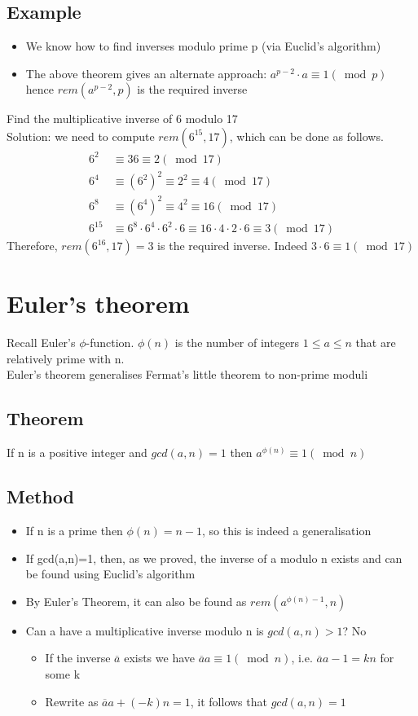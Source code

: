\documentclass{article}[18pt]
\begin{document}
\subsection{Example}
\begin{itemize}
	\item We know how to find inverses modulo prime p (via Euclid's algorithm)
	\item The above theorem gives an alternate approach: $a^{p-2}\cdot a\equiv 1 (\bmod p)$ hence $rem(a^{p-2},p)$ is the required inverse
\end{itemize}
Find the multiplicative inverse of 6 modulo 17\\
Solution: we need to compute $rem(6^{15},17)$, which can be done as follows.
$$\begin{aligned} 6 ^ { 2 } & \equiv 36 \equiv 2 ( \bmod 17 ) \\ 6 ^ { 4 } & \equiv \left( 6 ^ { 2 } \right) ^ { 2 } \equiv 2 ^ { 2 } \equiv 4 ( \bmod 17 ) \\ 6 ^ { 8 } & \equiv \left( 6 ^ { 4 } \right) ^ { 2 } \equiv 4 ^ { 2 } \equiv 16 ( \bmod 17 ) \\ 6 ^ { 15 } & \equiv 6 ^ { 8 } \cdot 6 ^ { 4 } \cdot 6 ^ { 2 } \cdot 6 \equiv 16 \cdot 4 \cdot 2 \cdot 6 \equiv 3 ( \bmod 17 ) \end{aligned}$$
Therefore, $rem(6^16,17)=3$ is the required inverse. Indeed $3\cdot 6\equiv 1 (\bmod 17)$
\section{Euler's theorem}
Recall Euler's $\phi$-function. $\phi(n)$ is the number of integers $1\leqslant a \leqslant n$ that are relatively prime with n.\\
Euler's theorem generalises Fermat's little theorem to non-prime moduli
\subsection{Theorem}
If n is a positive integer and $gcd(a,n)=1$ then $a^{\phi(n)}\equiv 1 (\bmod n)$
\subsection{Method}
\begin{itemize}
	\item If n is a prime then $\phi(n)=n-1$, so this is indeed a generalisation
	\item If gcd(a,n)=1, then, as we proved, the inverse of a modulo n exists and can be found using Euclid's algorithm
	\item By Euler's Theorem, it can also be found as $rem(a^{\phi(n)-1},n)$
	\item Can a have a multiplicative inverse modulo n is $gcd(a,n)>1$? No
	\begin{itemize}
		\item If the inverse $\overline{a}$ exists we have $\overline{a}a\equiv 1 (\bmod n)$, i.e. $\overline{a}a-1=kn$ for some k
		\item Rewrite as $\overline{a}a+(-k)n=1$, it follows that $gcd(a,n)=1$ 
	\end{itemize}
\end{itemize}
\end{document}
